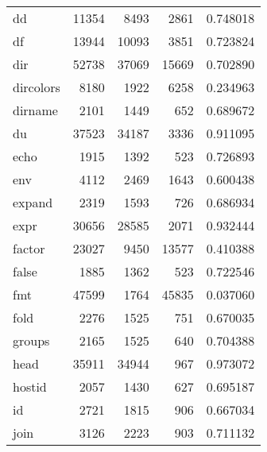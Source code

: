 \begin{tabular}{lrrrr}
dd        &                    11354 &         8493 &          2861 &                 0.748018 \\
df        &                    13944 &        10093 &          3851 &                 0.723824 \\
dir       &                    52738 &        37069 &         15669 &                 0.702890 \\
dircolors &                     8180 &         1922 &          6258 &                 0.234963 \\
dirname   &                     2101 &         1449 &           652 &                 0.689672 \\
du        &                    37523 &        34187 &          3336 &                 0.911095 \\
echo      &                     1915 &         1392 &           523 &                 0.726893 \\
env       &                     4112 &         2469 &          1643 &                 0.600438 \\
expand    &                     2319 &         1593 &           726 &                 0.686934 \\
expr      &                    30656 &        28585 &          2071 &                 0.932444 \\
factor    &                    23027 &         9450 &         13577 &                 0.410388 \\
false     &                     1885 &         1362 &           523 &                 0.722546 \\
fmt       &                    47599 &         1764 &         45835 &                 0.037060 \\
fold      &                     2276 &         1525 &           751 &                 0.670035 \\
groups    &                     2165 &         1525 &           640 &                 0.704388 \\
head      &                    35911 &        34944 &           967 &                 0.973072 \\
hostid    &                     2057 &         1430 &           627 &                 0.695187 \\
id        &                     2721 &         1815 &           906 &                 0.667034 \\
join      &                     3126 &         2223 &           903 &                 0.711132 \\

\end{tabular}
